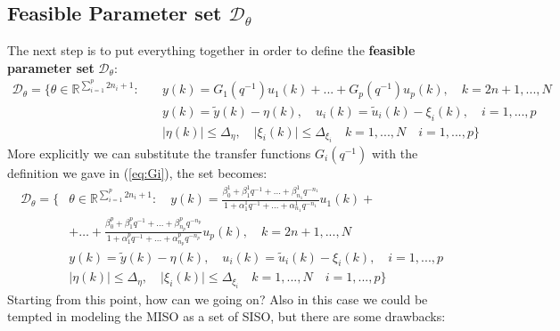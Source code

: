\subsection{Feasible Parameter set $\mathcal{D}_\theta$}
The next step is to put everything together in order to define the \textbf{feasible parameter set} $\mathcal{D}_\theta$:
\begin{equation}
    \begin{aligned}
        \mathcal{D}_\theta = \big\{
            \theta\in\mathbb{R}^{\sum_{i=1}^p{2n_i+1}}: \quad  
            &y(k)=G_1(q^{-1})u_1(k)+...+G_p(q^{-1})u_p(k),  \quad k=2n+1,...,N\\
            &y(k)=\tilde{y}(k)-\eta(k), \quad
            u_i(k)=\tilde{u}_i(k)-\xi_i(k), \quad i=1,...,p\\
            &
            \vert \eta(k) \vert \le \Delta_\eta, \quad \vert \xi_i(k) \vert \le \Delta_{\xi_i} \quad k=1,...,N \quad i=1,...,p
        \big\}
    \end{aligned}
\end{equation}
More explicitly we can substitute the transfer functions $G_i(q^{-1})$ with the definition we gave in (\ref{eq:Gi}), the set becomes:
\begin{equation}
    \begin{aligned}\label{eq:FPS_MIMO2}
        \mathcal{D}_\theta = \big\{
            &\theta\in\mathbb{R}^{\sum_{i=1}^p{2n_i+1}}: \quad
            y(k)={
                \frac{
                    \beta_0^1+\beta_1^1{q^{-1}}+...+\beta_{n_1}^1{q^{-n_1}}
                }{1+\alpha_1^1{q^{-1}}+...+\alpha_{n_1}^1{q^{-n_1}}
                }
            }u_1(k)+\\
            &+\dots
            +{
                \frac{
                    \beta_0^p+\beta_1^p{q^{-1}}+...+\beta_{n_p}^p{q^{-n_p}}
                }{1+\alpha_1^p{q^{-1}}+...+\alpha_{n_p}^p{q^{-n_p}}
                }
            }u_p(k),  \quad k=2n+1,...,N\\
            &y(k)=\tilde{y}(k)-\eta(k), \quad
            u_i(k)=\tilde{u}_i(k)-\xi_i(k), \quad i=1,...,p\\
            &
            \vert \eta(k) \vert \le \Delta_\eta, \quad \vert \xi_i(k) \vert \le \Delta_{\xi_i} \quad k=1,...,N \quad i=1,...,p
        \big\}
    \end{aligned}
\end{equation} 
Starting from this point, how can we going on? Also in this case we could be tempted in modeling the MISO as a set of SISO, but there are some drawbacks: 
